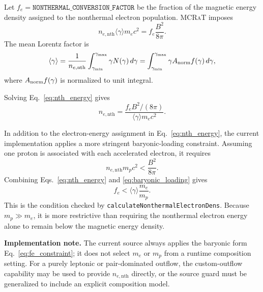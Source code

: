 \documentclass[12pt,a4paper]{article}
\newcommand{\gmin}{\gamma_{\min}}
\newcommand{\gmax}{\gamma_{\max}}
\newcommand{\code}[1]{\texttt{#1}}
\newcommand{\mcrat}{\textsc{MCRaT}}
\newenvironment{implementationnote}{%
	\begin{framed}\noindent\textbf{Implementation note.}\quad}
	{\end{framed}}
\begin{document}
Let $f_e=\code{NONTHERMAL\_CONVERSION\_FACTOR}$ be the fraction of the
magnetic energy density assigned to the nonthermal electron population.
\mcrat{} imposes
\begin{equation}
	n_{e,\mathrm{nth}}
	\langle\gamma\rangle m_ec^2
	=
	f_e\frac{B^2}{8\pi}.
	\label{eq:nth_energy}
\end{equation}
The mean Lorentz factor is
\begin{equation}
	\langle\gamma\rangle
	=
	\frac{1}{n_{e,\mathrm{nth}}}
	\int_{\gmin}^{\gmax}
	\gamma N(\gamma)\,d\gamma
	=
	\int_{\gmin}^{\gmax}
	\gamma A_{\rm norm}f(\gamma)\,d\gamma,
	\label{eq:mean_gamma}
\end{equation}
where $A_{\rm norm}f(\gamma)$ is normalized to unit integral.

Solving Eq.~\eqref{eq:nth_energy} gives
\begin{equation}
	n_{e,\mathrm{nth}}
	=
	\frac{
		f_e B^2/(8\pi)
	}{
		\langle\gamma\rangle m_ec^2
	}.
	\label{eq:nth_dens}
\end{equation}

In addition to the electron-energy assignment in
Eq.~\eqref{eq:nth_energy}, the current implementation applies a more
stringent baryonic-loading constraint. Assuming one proton is associated
with each accelerated electron, it requires
\begin{equation}
	n_{e,\mathrm{nth}}m_pc^2
	<
	\frac{B^2}{8\pi}.
	\label{eq:baryonic_loading}
\end{equation}
Combining Eqs.~\eqref{eq:nth_energy} and
\eqref{eq:baryonic_loading} gives
\begin{equation}
	f_e
	<
	\langle\gamma\rangle\frac{m_e}{m_p}.
	\label{eq:fe_constraint}
\end{equation}
This is the condition checked by
\code{calculateNonthermalElectronDens}. Because $m_p\gg m_e$, it is
more restrictive than requiring the nonthermal electron energy alone
to remain below the magnetic energy density.

\begin{implementationnote}
	The current source always applies the baryonic form
	Eq.~\eqref{eq:fe_constraint}; it does not select $m_e$ or $m_p$ from a
	runtime composition setting. For a purely leptonic or pair-dominated
	outflow, the custom-outflow capability may be used to provide
	$n_{e,\mathrm{nth}}$ directly, or the source guard must be generalized
	to include an explicit composition model.
\end{implementationnote}

\end{document}
